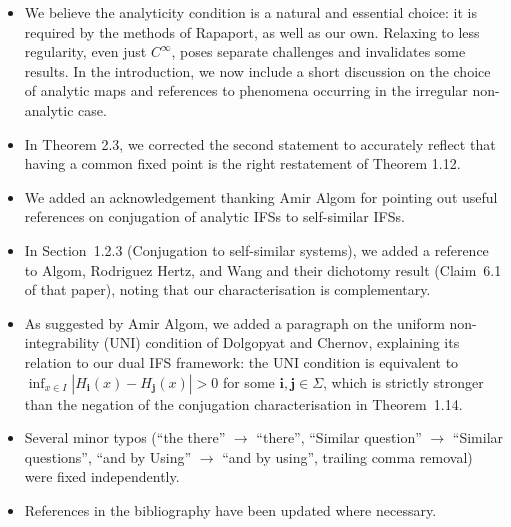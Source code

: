 \documentclass[11pt]{article}
\begin{document}
\begin{itemize}
  \item  We believe the analyticity condition is a natural and essential choice: it is required by the methods
    of Rapaport, as well as our own. Relaxing to less regularity, even just $C^\infty$,
    poses separate challenges and invalidates some results. 
    In the introduction, we now include a short discussion on the choice of analytic maps and
    references to phenomena occurring in the irregular non-analytic case.

  \item In Theorem 2.3, we corrected the second statement to accurately reflect that having
    a common fixed point is the right restatement of Theorem 1.12.

  \item We added an acknowledgement thanking Amir Algom for pointing out useful references on
    conjugation of analytic IFSs to self-similar IFSs.

  \item In Section~1.2.3 (Conjugation to self-similar systems), we added a reference to Algom,
    Rodriguez Hertz, and Wang \cite{AlgomHertzWang23} and their dichotomy result (Claim~6.1 of that
    paper), noting that our characterisation is complementary.

  \item As suggested by Amir Algom, we added a paragraph on the uniform non-integrability (UNI) condition of Dolgopyat and
    Chernov, explaining its relation to our dual IFS framework: the UNI condition is equivalent to
    $\inf_{x\in I} |H_{\mathbf{i}}(x) - H_{\mathbf{j}}(x)| > 0$ for some
    $\mathbf{i},\mathbf{j}\in\Sigma$, which is strictly stronger than the negation of the
    conjugation characterisation in Theorem~1.14.

  \item Several minor typos (``the there'' $\to$ ``there'', ``Similar question'' $\to$ ``Similar
    questions'', ``and by Using'' $\to$ ``and by using'', trailing comma removal) were fixed
    independently.

  \item References in the bibliography have been updated where necessary.
\end{itemize}


\printbibliography
\end{document}
